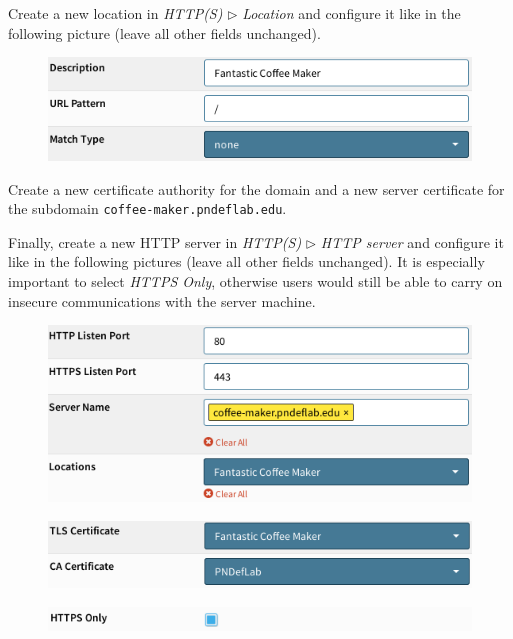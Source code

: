 \documentclass[draft]{homework}
\begin{document}
    Create a new location in \textit{HTTP(S)} $\triangleright$ \textit{Location} and configure it like in the following picture (leave all other fields unchanged).
    \vspace{-5pt}
    \begin{figure}[H]
        \centering
        \includegraphics[width=1\linewidth]{images/location}
        \label{fig:location}
    \end{figure}
    \vspace{-20pt}
    
    Create a new certificate authority for the domain and a new server certificate for the subdomain \texttt{coffee-maker.pndeflab.edu}.
    
    Finally, create a new HTTP server in \textit{HTTP(S)} $\triangleright$ \textit{HTTP server} and configure it like in the following pictures (leave all other fields unchanged).
    It is especially important to select \textit{HTTPS Only}, otherwise users would still be able to carry on insecure communications with the server machine.
    \vspace{-5pt}
    \begin{figure}[H]
        \centering
        \includegraphics[width=1\linewidth]{images/http-server-1}
        \label{fig:http-server-1}
    \end{figure}
    \vspace{-20pt}
    \begin{figure}[H]
        \centering
        \includegraphics[width=1\linewidth]{images/http-server-2}
        \label{fig:http-server-2}
    \end{figure}
    \vspace{-20pt}
    \begin{figure}[H]
        \centering
        \includegraphics[width=1\linewidth]{images/http-server-3}
        \label{fig:http-server-3}
    \end{figure}
    \vspace{-20pt}
    
\end{document}
